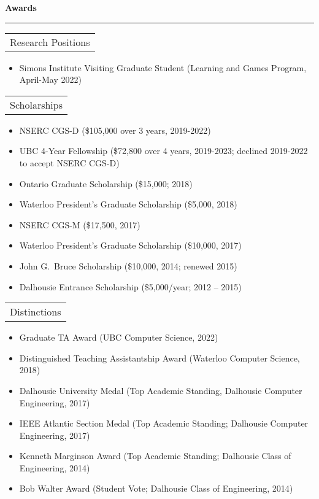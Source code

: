 \documentclass{article}
\newcommand{\heading}[1]
{
	\vspace{3pt}
	{\bf #1} 
	\vspace{-6pt}
	
	\rule{\linewidth}{0.4pt}
}
\begin{document}
\heading{Awards}
\begin{tabularx}{\textwidth}{X}
    Research Positions \\
\end{tabularx}
\begin{itemize}
    \item Simons Institute Visiting Graduate Student (Learning and Games Program, April-May 2022)  
\end{itemize}
\begin{tabularx}{\textwidth}{X}
    Scholarships \\
\end{tabularx}
\begin{itemize}
\item NSERC CGS-D (\$105,000 over 3 years, 2019-2022)
\item UBC 4-Year Fellowship (\$72,800 over 4 years, 2019-2023; declined 2019-2022 to accept NSERC CGS-D)
\item Ontario Graduate Scholarship (\$15,000; 2018)
\item Waterloo President's Graduate Scholarship (\$5,000, 2018)
\item NSERC CGS-M (\$17,500, 2017)
\item Waterloo President's Graduate Scholarship (\$10,000, 2017)
\item John G.~Bruce Scholarship (\$10,000, 2014; renewed 2015)
\item Dalhousie Entrance Scholarship (\$5,000/year; 2012 -- 2015)
\end{itemize}
\begin{tabularx}{\textwidth}{X}
    Distinctions \\
\end{tabularx}
\begin{itemize}
\item Graduate TA Award (UBC Computer Science, 2022) 
\item Distinguished Teaching Assistantship Award (Waterloo Computer Science, 2018)
\item Dalhousie University Medal (Top Academic Standing, Dalhousie Computer Engineering, 2017)
\item IEEE Atlantic Section Medal (Top Academic Standing; Dalhousie Computer Engineering, 2017)
\item Kenneth Marginson Award (Top Academic Standing; Dalhousie Class of Engineering, 2014)
\item Bob Walter Award (Student Vote; Dalhousie Class of Engineering, 2014) 
\end{itemize}
\end{document}
